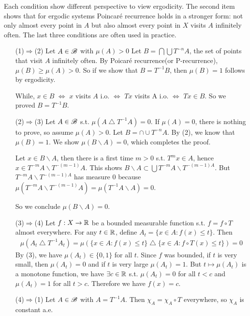 \documentclass[10pt,a4paper]{report}
\newenvironment{proof}
{\begin{changemargin}{1cm}{0.5cm} 
	}%
	{\end{changemargin}
}
\begin{document}
Each condition show different perspective to view ergodicity. The second item shows that for ergodic systems Poincar\'{e} recurrence holds in a stronger form: not only almost every point in $A$ but also almost every point in $X$ visits $A$ infinitely often. The last three conditions are often used in practice.
\begin{proof}
\pf \begin{itemize}
\item[(1)$\Rightarrow$(2)] Let $A\in \mathscr{B}$ with $\mu(A) >0$ Let $B = \bigcap \bigcup T^{-n}A$, the set of points that visit $A$ infinitely often. By Poicar\'{e} recurrence(or P-recurrence), $\mu(B) \geq \mu(A) >0$. So if we show that $B = T^{-1}B$, then $\mu(B)=1$ follows by ergodicity.

\quad While, $x\in B$ $\Leftrightarrow$ $x$ visits $A$ i.o. $\Leftrightarrow$ $Tx$ visits A i.o. $\Leftrightarrow$ $Tx \in B$. So we proved $B = T^{-1}B$.
\item[(2)$\Rightarrow$(3)] Let $A\in \mathscr{B}$ s.t. $\mu(A \bigtriangleup T^{-1} A) =0$. If $\mu(A) =0$, there is nothing to prove, so assume $\mu(A)>0$. Let $B= \cap \cup T^{-n} A$. By (2), we know that $\mu(B) = 1$. We show $\mu(B\backslash A) =0$, which completes the proof.

\quad Let $x\in B\backslash A$, then there is a first time $m>0$ s.t. $T^m x\in A$, hence $x\in T^{-m}A \backslash T^{-(m-1)}A$. This shows $B\backslash A \subset \bigcup T^{-m} A \backslash T^{-(m-1)A}$. But $T^{-m} A \backslash T^{-(m-1)A}$ has measure 0 because $\mu(T^{-m} A \backslash T^{-(m-1)}A)= \mu(T^{-1}A\backslash A) =0$.

\quad So we conclude $\mu(B\backslash A) =0$.
\item[(3)$\Rightarrow$(4)] Let $f:X\rightarrow \mathbb{R}$ be a bounded measurable function s.t. $f= f\circ T$ almost everywhere. For any $t\in \mathbb{R}$, define $A_t = \{x\in A : f(x) \leq t\}$. Then
\begin{align*}
\mu(A_t \bigtriangleup T^{-1}A_t) = \mu( \{x\in A : f(x) \leq t\} \bigtriangleup \{x\in A : f \circ T(x) \leq t\}) =0
\end{align*} 
By (3), we have $\mu(A_t)\in \{0,1\}$ for all $t$. Since $f$ was bounded, if $t$ is very small, then $\mu(A_t)=0$ and if $t$ is very large $\mu(A_t) =1$. But $t\mapsto \mu(A_t)$ is a monotone function, we have $\exists c \in \mathbb{R}$ s.t. $\mu(A_t) =0$ for all $t<c$ and $\mu(A_t) =1$ for all $t>c$. Therefore we have $f(x)=c$.
\item[(4)$\Rightarrow$(1)] Let $A\in \mathscr{B}$ with $A = T^{-1}A$. Then $\chi_A = \chi_A \circ T$ everywhere, so $\chi_A$ is constant a.e.
\end{itemize}
\end{proof}
\s
\end{document}
